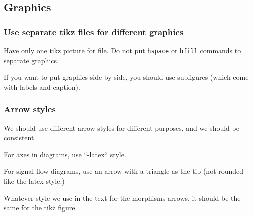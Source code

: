 \subsection*{Graphics}

\subsubsection*{Use separate tikz files for different graphics}

Have only one tikz picture for file.
Do not put \texttt{hspace} or \texttt{hfill} commands to separate graphics.

If you want to put graphics side by side, you should use subfigures (which come with labels and caption).

\subsubsection*{Arrow styles}

We should use different arrow styles for different purposes,
and we should be consistent.

For axes in diagrams, use ``-latex`` style.

For signal flow diagrams, use an arrow with a triangle as the tip (not rounded like the latex style.)

Whatever style we use in the text for the morphisms arrows, it should be the same for the tikz figure.

